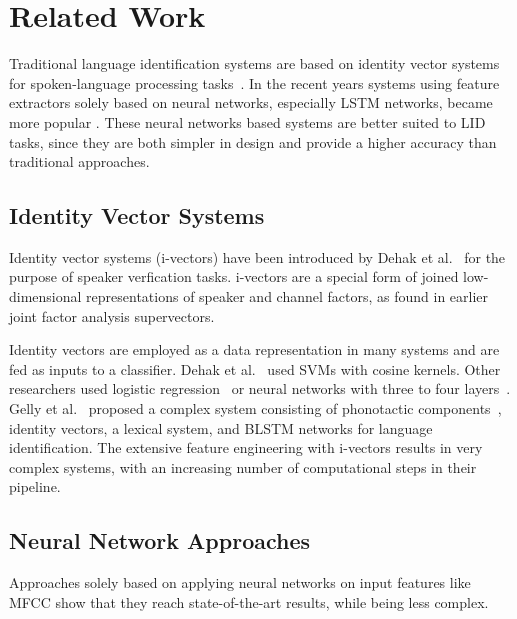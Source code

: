 \documentclass{llncs}
\begin{document}
 \section{Related Work}
\label{sec:related_work}

Traditional language identification systems are based on identity vector systems for spoken-language processing tasks~\cite{Dehak2011FrontEnd,Martinez2011Language,Plchot2016Bat,Zazo2016Language}.
In the recent years systems using feature extractors solely based on neural networks, especially \ac{LSTM} networks, became more popular \cite{Gelly2016DivideAndConquer,Diez2015EndToEnd,Zazo2016Language}.
These neural networks based systems are better suited to \ac{LID} tasks, since they are both simpler in design and provide a higher accuracy than traditional approaches.

\subsection{Identity Vector Systems}

Identity vector systems (i-vectors) have been introduced by Dehak et al.~\cite{Dehak2011FrontEnd} for the purpose of speaker verfication tasks.
i-vectors are a special form of joined low-dimensional representations of speaker and channel factors, as found in earlier joint factor analysis supervectors.

Identity vectors are employed as a data representation in many systems and are fed as inputs to a classifier.
Dehak et al.~\cite{Dehak2011FrontEnd} used \acp{SVM} with cosine kernels.
Other researchers used logistic regression~\cite{Martinez2011Language} or neural networks with three to four layers~\cite{Dominguez2015FrameByFrame,Plchot2016Bat}.
Gelly et al.~\cite{Gelly2016Language} proposed a complex system consisting of phonotactic components~\cite{Zissman1996Comparison}, identity vectors, a lexical system, and \ac{BLSTM} networks for language identification.
The extensive feature engineering with i-vectors results in very complex systems, with an increasing number of computational steps in their pipeline.

\subsection{Neural Network Approaches}

Approaches solely based on applying neural networks on input features like \ac{MFCC} show that they reach state-of-the-art results, while being less complex.
\end{document}
